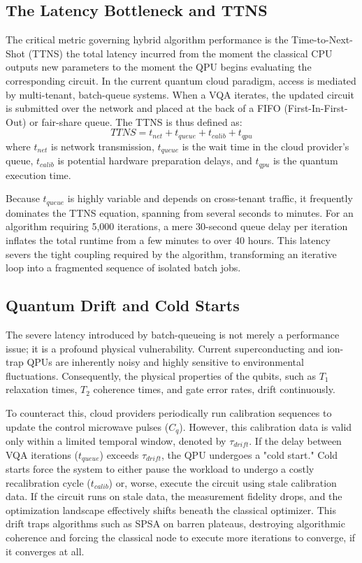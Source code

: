 \documentclass[conference]{IEEEtran}
\begin{document}
\subsection{The Latency Bottleneck and TTNS}
The critical metric governing hybrid algorithm performance is the Time-to-Next-Shot (TTNS) the total latency incurred from the moment the classical CPU outputs new parameters to the moment the QPU begins evaluating the corresponding circuit. 
In the current quantum cloud paradigm, access is mediated by multi-tenant, batch-queue systems. When a VQA iterates, the updated circuit is submitted over the network and placed at the back of a FIFO (First-In-First-Out) or fair-share queue. The TTNS is thus defined as:
\begin{equation}
    TTNS = t_{net} + t_{queue} + t_{calib} + t_{qpu}
\end{equation}
where $t_{net}$ is network transmission, $t_{queue}$ is the wait time in the cloud provider's queue, $t_{calib}$ is potential hardware preparation delays, and $t_{qpu}$ is the quantum execution time. 


Because $t_{queue}$ is highly variable and depends on cross-tenant traffic, it frequently dominates the TTNS equation, spanning from several seconds to minutes. For an algorithm requiring 5,000 iterations, a mere 30-second queue delay per iteration inflates the total runtime from a few minutes to over 40 hours. This latency severs the tight coupling required by the algorithm, transforming an iterative loop into a fragmented sequence of isolated batch jobs.

\subsection{Quantum Drift and Cold Starts}
The severe latency introduced by batch-queueing is not merely a performance issue; it is a profound physical vulnerability. Current superconducting and ion-trap QPUs are inherently noisy and highly sensitive to environmental fluctuations. Consequently, the physical properties of the qubits, such as $T_1$ relaxation times, $T_2$ coherence times, and gate error rates, drift continuously. 

To counteract this, cloud providers periodically run calibration sequences to update the control microwave pulses ($C_q$).
However, this calibration data is valid only within a limited temporal window, denoted by $\tau_{drift}$. If the delay between VQA iterations ($t_{queue}$) exceeds $\tau_{drift}$, the QPU undergoes a "cold start." 
Cold starts force the system to either pause the workload to undergo a costly recalibration cycle ($t_{calib}$) or, worse, execute the circuit using stale calibration data. If the circuit runs on stale data, the measurement fidelity drops, and the optimization landscape effectively shifts beneath the classical optimizer. This drift traps algorithms such as SPSA on barren plateaus, destroying algorithmic coherence and forcing the classical node to execute more iterations to converge, if it converges at all.
\end{document}
